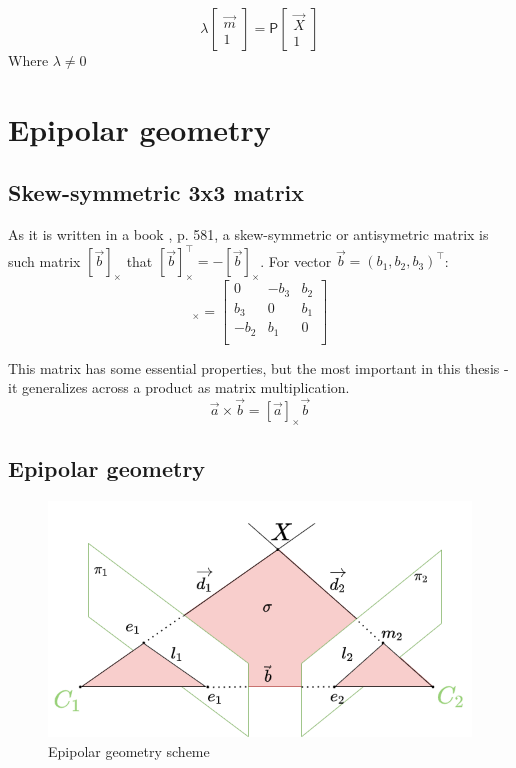 \begin{equation}
    \lambda \begin{bmatrix} 
    \vec{m} \\ 1 \end{bmatrix} = \pmb{\mathsf{P}} \begin{bmatrix} \vec{X} \\ 1
        \end{bmatrix}
\end{equation}
Where $\lambda \neq 0$

\section{Epipolar geometry}

\subsection{Skew-symmetric 3x3 matrix}
As it is written in a book \cite{hartley_zisserman_2004}, p. 581, a skew-symmetric or antisymetric matrix is such matrix $[\vec{b}]_{\times}$ that $[\vec{b}]_{\times}^\top = -[\vec{b}]_{\times}$. 
For vector $\vec{b} = (b_1, b_2, b_3)^\top$:
\begin{equation}
    [\vec{b}]_{\times} = \begin{bmatrix}
        0 & -b_3 & b_2 \\ 
        b_3 & 0 & b_1 \\ 
        -b_2 & b_1 & 0 \\ 
    \end{bmatrix}    
\end{equation}

This matrix has some essential properties, but the most important in this thesis - it generalizes across a product as matrix multiplication.
\begin{equation}
    \vec{a} \times \vec{b} = [\vec{a}]_{\times} \vec{b}
\end{equation}

\subsection{Epipolar geometry}
\begin{figure}[h]
    \centering
    \includegraphics[width=1\textwidth]{graphics/epipolar.png}
    \caption{Epipolar geometry scheme}
    \label{fig:epipolar_std}
\end{figure}

